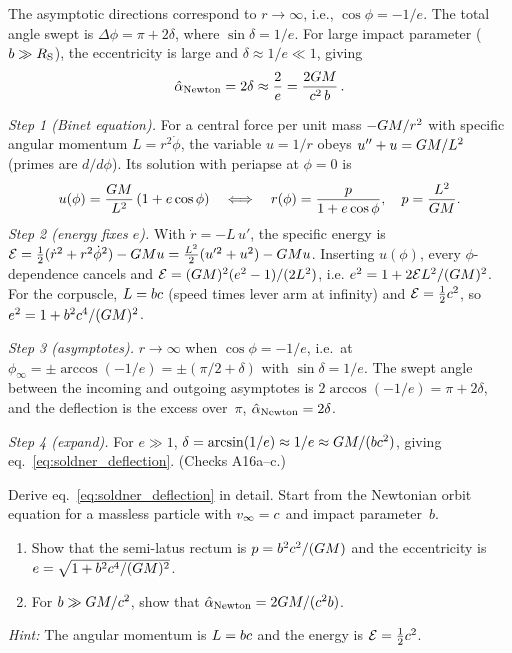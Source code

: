 The asymptotic directions correspond to $r \to \infty$, i.e.,
$\cos\phi = -1/e$.  The total angle swept is $\Delta\phi = \pi + 2\delta$,
where $\sin\delta = 1/e$.  For large impact parameter ($b \gg R_{\mathrm{S}}$), the
eccentricity is large and $\delta \approx 1/e \ll 1$, giving
\begin{equation}
    \hat{\alpha}_{\mathrm{Newton}} = 2\delta \approx \frac{2}{e}
    = \frac{2G M}{c^2\, b} \,.
    \label{eq:soldner_deflection}
\end{equation}


\begin{derivation}
\textit{Step 1 (Binet equation).}  For a central force per unit mass
$-G M/r^2$ with specific angular momentum $L = r^2\dot\phi$, the variable
$u = 1/r$ obeys $u'' + u = G M/L^2$ (primes are $d/d\phi$).  Its solution
with periapse at $\phi = 0$ is
\[
    u(\phi) = \frac{G M}{L^2}\,(1 + e\cos\phi)
    \quad\Longleftrightarrow\quad
    r(\phi) = \frac{p}{1 + e\cos\phi}, \quad p = \frac{L^2}{G M}.
\]
\textit{Step 2 (energy fixes $e$).}  With $\dot r = -L\,u'$, the specific
energy is $\mathcal{E} = \tfrac{1}{2}(\dot r^2 + r^2\dot\phi^2) - G M u
= \tfrac{L^2}{2}(u'^2 + u^2) - G M u$.  Inserting $u(\phi)$, every
$\phi$-dependence cancels and
$\mathcal{E} = (G M)^2(e^2-1)/(2L^2)$, i.e.
$e^2 = 1 + 2\mathcal{E}L^2/(G M)^2$.  For the corpuscle,
$L = bc$ (speed times lever arm at infinity) and
$\mathcal{E} = \tfrac12c^2$, so
$e^2 = 1 + b^2c^4/(G M)^2$.

\textit{Step 3 (asymptotes).}  $r \to \infty$ when $\cos\phi = -1/e$, i.e.\ at
$\phi_\infty = \pm\arccos(-1/e) = \pm(\pi/2 + \delta)$ with $\sin\delta = 1/e$.
The swept angle between the incoming and outgoing asymptotes is
$2\arccos(-1/e) = \pi + 2\delta$, and the deflection is the excess over~$\pi$,
$\hat{\alpha}_{\rm Newton} = 2\delta$.

\textit{Step 4 (expand).}  For $e \gg 1$, $\delta = \arcsin(1/e) \approx 1/e
\approx G M/(bc^2)$, giving
eq.~\eqref{eq:soldner_deflection}.
(Checks A16a--c.)
\end{derivation}
\begin{exercise}
\label{ex:soldner}
Derive eq.~\eqref{eq:soldner_deflection} in detail.  Start from the
Newtonian orbit equation for a massless particle with $v_\infty =
c$ and impact parameter~$b$.
\begin{enumerate}[label=(\alph*)]
    \item Show that the semi-latus rectum is $p = b^2 c^2 /
          (G M)$ and the eccentricity is
          $e = \sqrt{1 + b^2 c^4 / (G M)^2}$.
    \item For $b \gg G M / c^2$, show that
          $\hat{\alpha}_{\mathrm{Newton}} = 2G M /
          (c^2 b)$.
\end{enumerate}
\textit{Hint:} The angular momentum is $L = bc$ and the energy
is $\mathcal{E} = \tfrac{1}{2} c^2$.
\end{exercise}


